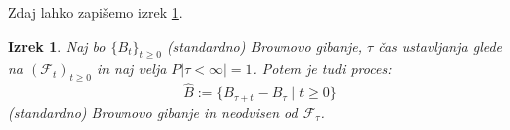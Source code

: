 \documentclass[11pt]{article}
\newtheorem{izrek}{Izrek}
\newcommand{\f}{\mathcal{F}}
\begin{document}
    Zdaj lahko zapišemo izrek \ref{thm:stopped_brownian}. %
    
    
    \begin{izrek}
        \label{thm:stopped_brownian}
        Naj bo \(\{B_t\}_{t \geq 0}\) (standardno) Brownovo gibanje, \(\tau\) čas ustavljanja glede na
        $(\f_t)_{t \geq 0}$ in naj velja $P|\tau < \infty| = 1$.
        Potem je tudi proces:
        \[
        \hat{B} := \{B_{\tau+t} - B_\tau \mid t \geq 0\}
        \]
        (standardno) Brownovo gibanje in neodvisen od $\f_\tau$.
    \end{izrek}

    
    


    
\end{document}
